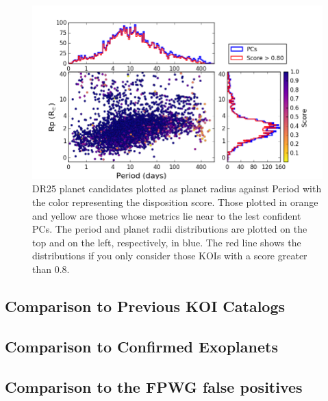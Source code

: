 \begin{figure}
    \centering
    \includegraphics[width=1.1\linewidth]{fig-radiusPeriodScore-hist.png}
    \caption{DR25 planet candidates plotted as planet radius against Period with the color representing the disposition score. Those plotted in orange and yellow are those whose metrics lie near to the lest confident PCs.  The period and planet radii distributions are plotted on the top and on the left, respectively, in blue. The red line shows the distributions if you only consider those KOIs with a score greater than 0.8. }
    \label{f:catalogPlot}
\end{figure}



\subsection{Comparison to Previous KOI Catalogs}

\subsection{Comparison to Confirmed Exoplanets}

\subsection{Comparison to the FPWG false positives}



